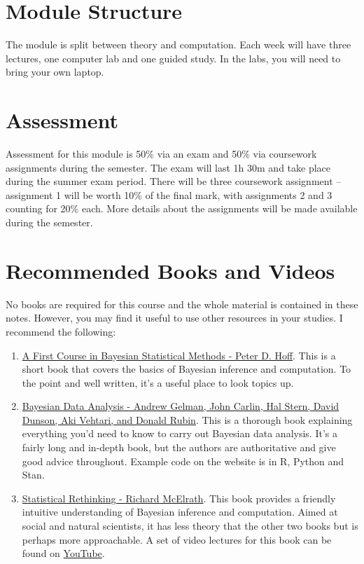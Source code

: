 \documentclass[
]{book}
\theoremstyle{definition}
\theoremstyle{definition}
\theoremstyle{definition}
\theoremstyle{definition}
\theoremstyle{remark}
\begin{document}
\hypertarget{module-structure}{%
\section{Module Structure}\label{module-structure}}

The module is split between theory and computation. Each week will have three lectures, one computer lab and one guided study. In the labs, you will need to bring your own laptop.

\hypertarget{assessment}{%
\section{Assessment}\label{assessment}}

Assessment for this module is 50\% via an exam and 50\% via coursework
assignments during the semester. The exam will last 1h 30m and take
place during the summer exam period. There will be three coursework
assignment -- assignment 1 will be worth 10\% of the final mark, with
assignments 2 and 3 counting for 20\% each. More details about the
assignments will be made available during the semester.

\hypertarget{recommended-books-and-videos}{%
\section{Recommended Books and Videos}\label{recommended-books-and-videos}}

No books are required for this course and the whole material is
contained in these notes. However, you may find it useful to use other
resources in your studies. I recommend the following:

\begin{enumerate}
\def\labelenumi{\arabic{enumi}.}
\item
  \href{https://link.springer.com/book/10.1007/978-0-387-92407-6}{A First Course in Bayesian Statistical Methods - Peter D.
  Hoff}.
  This is a short book that covers the basics of Bayesian inference
  and computation. To the point and well written, it's a useful place
  to look topics up.
\item
  \href{http://www.stat.columbia.edu/~gelman/book/}{Bayesian Data Analysis - Andrew Gelman, John Carlin, Hal Stern,
  David Dunson, Aki Vehtari, and Donald
  Rubin}. This is a
  thorough book explaining everything you'd need to know to carry out
  Bayesian data analysis. It's a fairly long and in-depth book, but
  the authors are authoritative and give good advice throughout.
  Example code on the website is in R, Python and Stan.
\item
  \href{https://xcelab.net/rm/statistical-rethinking/}{Statistical Rethinking - Richard
  McElrath}. This book
  provides a friendly intuitive understanding of Bayesian inference
  and computation. Aimed at social and natural scientists, it has less
  theory that the other two books but is perhaps more approachable. A
  set of video lectures for this book can be found on
  \href{https://www.youtube.com/playlist?list=PLDcUM9US4XdMROZ57-OIRtIK0aOynbgZN}{YouTube}.
\end{enumerate}
\end{document}
